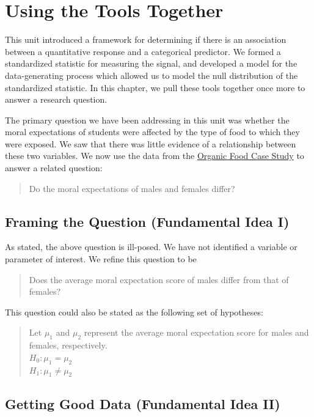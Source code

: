 \documentclass[]{book}
\theoremstyle{plain}
\theoremstyle{mydefn}
\theoremstyle{myexmpl}
\theoremstyle{remark}
\begin{document}
\chapter{Using the Tools Together}\label{ANOVArecap}

This unit introduced a framework for determining if there is an
association between a quantitative response and a categorical predictor.
We formed a standardized statistic for measuring the signal, and
developed a model for the data-generating process which allowed us to
model the null distribution of the standardized statistic. In this
chapter, we pull these tools together once more to answer a research
question.

The primary question we have been addressing in this unit was whether
the moral expectations of students were affected by the type of food to
which they were exposed. We saw that there was little evidence of a
relationship between these two variables. We now use the data from the
\protect\hyperlink{CaseOrganic}{Organic Food Case Study} to answer a
related question:

\begin{quote}
Do the moral expectations of males and females differ?
\end{quote}

\section{Framing the Question (Fundamental Idea
I)}\label{framing-the-question-fundamental-idea-i-1}

As stated, the above question is ill-posed. We have not identified a
variable or parameter of interest. We refine this question to be

\begin{quote}
Does the average moral expectation score of males differ from that of
females?
\end{quote}

This question could also be stated as the following set of hypotheses:

\begin{quote}
Let \(\mu_1\) and \(\mu_2\) represent the average moral expectation
score for males and females, respectively.\\
\(H_0: \mu_1 = \mu_2\)\\
\(H_1: \mu_1 \neq \mu_2\)
\end{quote}

\section{Getting Good Data (Fundamental Idea
II)}\label{getting-good-data-fundamental-idea-ii-1}
\end{document}
